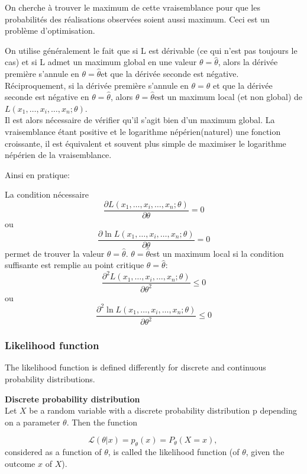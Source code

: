 \documentclass{article}
\begin{document}
On cherche à trouver le maximum de cette vraisemblance pour que les probabilit\'es des r\'ealisations observ\'ees soient aussi maximum.
Ceci est un probl\`eme d'optimisation.

On utilise g\'en\'eralement le fait que si L est d\'erivable (ce qui n'est pas toujours le cas) et
si L admet un maximum global en une valeur $\theta = \hat \theta$,
alors la d\'eriv\'ee premi\`ere s'annule en $\theta = \hat \theta $et que la d\'eriv\'ee seconde est n\'egative. \\
R\'eciproquement, si la d\'eriv\'ee premi\`ere s'annule en $\theta = \hat \theta$ et que la d\'eriv\'ee seconde est n\'egative en $\theta = \hat \theta$,
alors $\theta = \hat \theta $est un maximum local (et non global) de $L(x_1, \ldots, x_i, \ldots,x_n;\theta)$. \\
Il est alors n\'ecessaire de v\'erifier qu'il s'agit bien d'un maximum global.
La vraisemblance \'etant positive et le logarithme n\'ep\'erien(naturel) une fonction croissante,
il est \'equivalent et souvent plus simple de maximiser le logarithme n\'ep\'erien de la vraisemblance.

Ainsi en pratique:

La condition n\'ecessaire
$$ \frac{\partial L(x_1, \ldots, x_i, \ldots, x_n;\theta)}{\partial \theta} = 0 $$
ou
$$ \frac{\partial \ln L(x_1, \ldots, x_i, \ldots, x_n;\theta)}{\partial \theta} = 0 $$
permet de trouver la valeur $\theta = \hat \theta$.
$\theta = \hat \theta $est un maximum local si la condition suffisante est remplie au point critique $\theta = \hat \theta $:
$$ \frac{\partial^2 L(x_1, \ldots, x_i, \ldots, x_n;\theta)}{\partial \theta^2} \le 0 $$
ou
$$ \frac{\partial^2 \ln L(x_1, \ldots, x_i, \ldots,x_n;\theta)}{\partial \theta^2} \le 0 $$

\subsubsection{Likelihood function}
The likelihood function is defined differently for discrete and continuous probability distributions.

\textbf{Discrete probability distribution}\\
Let $X$ be a random variable with a discrete probability distribution p depending on a parameter $\theta$. Then the function

$$ \mathcal{L}(\theta |x) = p_\theta (x) = P_\theta (X=x), \, $$
considered as a function of $\theta$, is called the likelihood function (of $\theta$, given the outcome $x$ of $X$).
\end{document}
